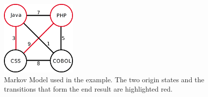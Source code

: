 \begin{figure}[!htp]
    \centering
    \includegraphics[width=0.33\textwidth]{images/markov_impl.png}
    \caption[Diagram: Search Suggestion Markov Model]{Markov Model used in the example. The two origin states and the transitions that form the end result are highlighted red.}
    \label{fig:wireframe}
\end{figure}


